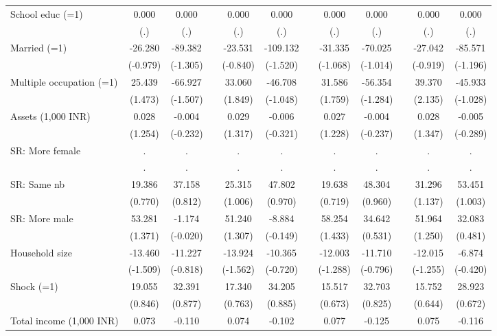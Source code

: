 {\begin{longtable}{@{\extracolsep{\fill}}lccccccccccc}
    School educ (=1) & 0.000 & 0.000 &   & 0.000 & 0.000 &   & 0.000 & 0.000 &   & 0.000 & 0.000 \\
      & (.) & (.) &   & (.) & (.) &   & (.) & (.) &   & (.) & (.) \\
    Married (=1) & -26.280 & -89.382 &   & -23.531 & -109.132 &   & -31.335 & -70.025 &   & -27.042 & -85.571 \\
      & (-0.979) & (-1.305) &   & (-0.840) & (-1.520) &   & (-1.068) & (-1.014) &   & (-0.919) & (-1.196) \\
    Multiple occupation (=1) & 25.439 & -66.927 &   & 33.060 & -46.708 &   & 31.586 & -56.354 &   & 39.370 & -45.933 \\
      & (1.473) & (-1.507) &   & (1.849) & (-1.048) &   & (1.759) & (-1.284) &   & (2.135) & (-1.028) \\
    Assets (1,000 INR) & 0.028 & -0.004 &   & 0.029 & -0.006 &   & 0.027 & -0.004 &   & 0.028 & -0.005 \\
      & (1.254) & (-0.232) &   & (1.317) & (-0.321) &   & (1.228) & (-0.237) &   & (1.347) & (-0.289) \\
    SR: More female & . & . &   & . & . &   & . & . &   & . & . \\
      & . & . &   & . & . &   & . & . &   & . & . \\
    SR: Same nb & 19.386 & 37.158 &   & 25.315 & 47.802 &   & 19.638 & 48.304 &   & 31.296 & 53.451 \\
      & (0.770) & (0.812) &   & (1.006) & (0.970) &   & (0.719) & (0.960) &   & (1.137) & (1.003) \\
    SR: More male & 53.281 & -1.174 &   & 51.240 & -8.884 &   & 58.254 & 34.642 &   & 51.964 & 32.083 \\
      & (1.371) & (-0.020) &   & (1.307) & (-0.149) &   & (1.433) & (0.531) &   & (1.250) & (0.481) \\
    Household size & -13.460 & -11.227 &   & -13.924 & -10.365 &   & -12.003 & -11.710 &   & -12.015 & -6.874 \\
      & (-1.509) & (-0.818) &   & (-1.562) & (-0.720) &   & (-1.288) & (-0.796) &   & (-1.255) & (-0.420) \\
    Shock (=1) & 19.055 & 32.391 &   & 17.340 & 34.205 &   & 15.517 & 32.703 &   & 15.752 & 28.923 \\
      & (0.846) & (0.877) &   & (0.763) & (0.885) &   & (0.673) & (0.825) &   & (0.644) & (0.672) \\
    Total income (1,000 INR) & 0.073 & -0.110 &   & 0.074 & -0.102 &   & 0.077 & -0.125 &   & 0.075 & -0.116 \\

\end{longtable}}
